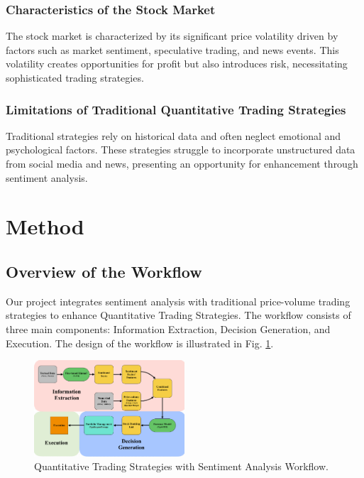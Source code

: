 \documentclass[conference]{IEEEtran}
\begin{document}
\subsubsection{\textbf{Characteristics of the Stock Market}}
The stock market is characterized by its significant price volatility driven by factors such as market sentiment, speculative trading, and news events. This volatility creates opportunities for profit but also introduces risk, necessitating sophisticated trading strategies.

\subsubsection{\textbf{Limitations of Traditional Quantitative Trading Strategies}}
Traditional strategies rely on historical data and often neglect emotional and psychological factors. These strategies struggle to incorporate unstructured data from social media and news, presenting an opportunity for enhancement through sentiment analysis.

\section{\textbf{Method}}
\subsection{\textbf{Overview of the Workflow}}

Our project integrates sentiment analysis with traditional price-volume trading strategies to enhance Quantitative Trading Strategies.
The workflow consists of three main components: Information Extraction, Decision Generation, and Execution. 
The design of the workflow is illustrated in Fig. \ref{fig:workflow}.

\begin{figure}[h]
    \centering
    \includegraphics[width=0.5\textwidth]{workflow.jpg}
    \caption{Quantitative Trading Strategies with Sentiment Analysis Workflow.}
    \label{fig:workflow}
\end{figure}
\end{document}
